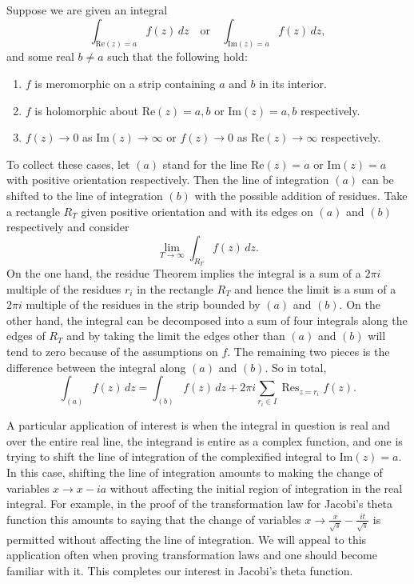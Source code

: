 \documentclass[12pt]{book}
\theoremstyle{definition}\newframedtheorem{method}{Method}
\newcommand{\<}{\langle}
\renewcommand{\>}{\rangle}
\DeclareMathOperator*{\Res}{\mathrm{Res}}
\renewcommand{\Re}{\mathrm{Re}}
\renewcommand{\Im}{\mathrm{Im}}
\begin{document}
      \begin{method}
        Suppose we are given an integral
        \[
          \int_{\Re(z) = a}f(z)\,dz \quad \text{or} \quad \int_{\Im(z) = a}f(z)\,dz,
        \]
        and some real $b \neq a$ such that the following hold:
        \begin{enumerate}[label=(\roman*)]
          \item $f$ is meromorphic on a strip containing $a$ and $b$ in its interior.
          \item $f$ is holomorphic about $\Re(z) = a,b$ or $\Im(z) = a,b$ respectively.
          \item $f(z) \to 0$ as $\Im(z) \to \infty$ or $f(z) \to 0$ as $\Re(z) \to \infty$ respectively.
        \end{enumerate}
        To collect these cases, let $(a)$ stand for the line $\Re(z) = a$ or $\Im(z) = a$ with positive orientation respectively. Then the line of integration $(a)$ can be shifted to the line of integration $(b)$ with the possible addition of residues. Take a rectangle $R_{T}$ given positive orientation and with its edges on $(a)$ and $(b)$ respectively and consider
        \[
          \lim_{T \to \infty}\int_{R_{T}}f(z)\,dz.
        \]
        On the one hand, the residue Theorem implies the integral is a sum of a $2\pi i$ multiple of the residues $r_{i}$ in the rectangle $R_{T}$ and hence the limit is a sum of a $2\pi i$ multiple of the residues in the strip bounded by $(a)$ and $(b)$. On the other hand, the integral can be decomposed into a sum of four integrals along the edges of $R_{T}$ and by taking the limit the edges other than $(a)$ and $(b)$ will tend to zero because of the assumptions on $f$. The remaining two pieces is the difference between the integral along $(a)$ and $(b)$. So in total,
        \[
          \int_{(a)}f(z)\,dz = \int_{(b)}f(z)\,dz+2\pi i\sum_{r_{i} \in I}\Res_{z = r_{i}}f(z).
        \]
      \end{method}

      A particular application of interest is when the integral in question is real and over the entire real line, the integrand is entire as a complex function, and one is trying to shift the line of integration of the complexified integral to $\Im(z) = a$. In this case, shifting the line of integration amounts to making the change of variables $x \to x-ia$ without affecting the initial region of integration in the real integral. For example, in the proof of the transformation law for Jacobi's theta function this amounts to saying that the change of variables $x \to \frac{x}{\sqrt{s}}-\frac{it}{\sqrt{s}}$ is permitted without affecting the line of integration. We will appeal to this application often when proving transformation laws and one should become familiar with it. This completes our interest in Jacobi's theta function.
\end{document}
